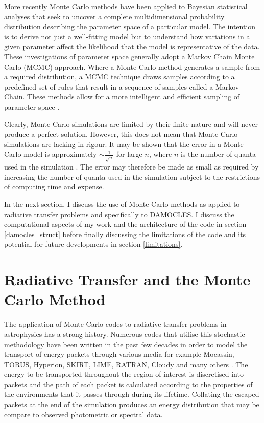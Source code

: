 	 More recently Monte Carlo methods have been applied to Bayesian statistical analyses that seek to uncover a complete multidimensional probability distribution describing the parameter space of a particular model.  The intention is to derive not just a well-fitting model but to understand how variations in a given parameter affect the likelihood that the model is representative of the data.  These investigations of parameter space generally adopt a Markov Chain Monte Carlo (MCMC) approach.  Where a Monte Carlo method generates a sample from a required distribution, a MCMC technique draws samples according to a predefined set of rules that result in a sequence of samples called a Markov Chain.  These methods allow for a more intelligent and efficient sampling of parameter space \citep{Metropolis1953, Hastings1970, Gilks1996}.  
	 	 
	 Clearly, Monte Carlo simulations are limited by their finite nature and will never produce a perfect solution.  However, this does not mean that Monte Carlo simulations are lacking in rigour.  It may be shown that the error in a Monte Carlo model is approximately $\sim \frac{1}{\sqrt{n}}$ for large $n$, where $n$ is the number of quanta used in the simulation \citep{Press2007}.  The error may therefore be made as small as required by increasing the number of quanta used in the simulation subject to the restrictions of computing time and expense.
	 
	 In the next section, I discuss the use of Monte Carlo methods as applied to radiative transfer problems and specifically to DAMOCLES.  I discuss the computational aspects of my work and the architecture of the code in section \ref{damocles_struct} before finally discussing the limitations of the code and its potential for future developments in section \ref{limitations}.
	 
\section{Radiative Transfer and the Monte Carlo Method}
\label{rt}

 The application of Monte Carlo codes to radiative transfer problems in astrophysics has a strong history.  Numerous codes that utilise this stochastic methodology have been written in the past few decades in order to model the transport of energy packets through various media for example Mocassin, TORUS, Hyperion, SKIRT, LIME, RATRAN, Cloudy and many others \citep{Harries2000, Hogerheijde2000, Baes2003, Ercolano2003, Ercolano2005, Brinch2010, Robitaille2011, Ferland2013}.  The energy to be transported throughout the region of interest is discretised into packets and the path of each packet is calculated according to the properties of the environments that it passes through during its lifetime.  Collating the escaped packets at the end of the simulation produces an energy distribution that may be compare to observed photometric or spectral data. 

